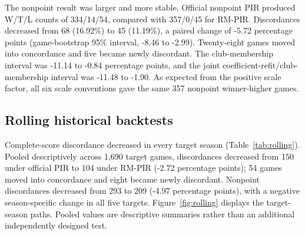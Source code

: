 \documentclass[pdflatex,sn-mathphys-num]{sn-jnl}
\begin{document}
The nonpoint result was larger and more stable. Official nonpoint PIR produced W/T/L counts of 334/14/54, compared with 357/0/45 for RM-PIR. Discordances decreased from 68 (16.92\%) to 45 (11.19\%), a paired change of -5.72 percentage points (game-bootstrap 95\% interval, -8.46 to -2.99). Twenty-eight games moved into concordance and five became newly discordant. The club-membership interval was -11.14 to -0.84 percentage points, and the joint coefficient-refit/club-membership interval was -11.48 to -1.90. As expected from the positive scale factor, all six scale conventions gave the same 357 nonpoint winner-higher games.

\subsection{Rolling historical backtests}

Complete-score discordance decreased in every target season (Table~\ref{tab:rolling}). Pooled descriptively across 1,690 target games, discordances decreased from 150 under official PIR to 104 under RM-PIR (-2.72 percentage points); 54 games moved into concordance and eight became newly discordant. Nonpoint discordances decreased from 293 to 209 (-4.97 percentage points), with a negative season-specific change in all five targets. Figure~\ref{fig:rolling} displays the target-season paths. Pooled values are descriptive summaries rather than an additional independently designed test.
\end{document}
